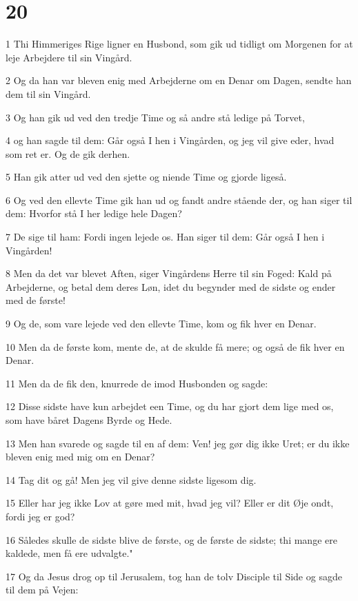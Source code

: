 \chapter{20}

\par 1 Thi Himmeriges Rige ligner en Husbond, som gik ud tidligt om Morgenen for at leje Arbejdere til sin Vingård.
\par 2 Og da han var bleven enig med Arbejderne om en Denar om Dagen, sendte han dem til sin Vingård.
\par 3 Og han gik ud ved den tredje Time og så andre stå ledige på Torvet,
\par 4 og han sagde til dem: Går også I hen i Vingården, og jeg vil give eder, hvad som ret er. Og de gik derhen.
\par 5 Han gik atter ud ved den sjette og niende Time og gjorde ligeså.
\par 6 Og ved den ellevte Time gik han ud og fandt andre stående der, og han siger til dem: Hvorfor stå I her ledige hele Dagen?
\par 7 De sige til ham: Fordi ingen lejede os. Han siger til dem: Går også I hen i Vingården!
\par 8 Men da det var blevet Aften, siger Vingårdens Herre til sin Foged: Kald på Arbejderne, og betal dem deres Løn, idet du begynder med de sidste og ender med de første!
\par 9 Og de, som vare lejede ved den ellevte Time, kom og fik hver en Denar.
\par 10 Men da de første kom, mente de, at de skulde få mere; og også de fik hver en Denar.
\par 11 Men da de fik den, knurrede de imod Husbonden og sagde:
\par 12 Disse sidste have kun arbejdet een Time, og du har gjort dem lige med os, som have båret Dagens Byrde og Hede.
\par 13 Men han svarede og sagde til en af dem: Ven! jeg gør dig ikke Uret; er du ikke bleven enig med mig om en Denar?
\par 14 Tag dit og gå! Men jeg vil give denne sidste ligesom dig.
\par 15 Eller har jeg ikke Lov at gøre med mit, hvad jeg vil? Eller er dit Øje ondt, fordi jeg er god?
\par 16 Således skulle de sidste blive de første, og de første de sidste; thi mange ere kaldede, men få ere udvalgte."
\par 17 Og da Jesus drog op til Jerusalem, tog han de tolv Disciple til Side og sagde til dem på Vejen:

